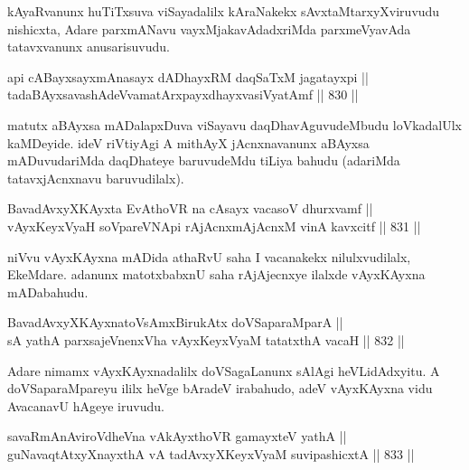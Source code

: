 \begin{artha}
kAyaRvanunx huTiTxsuva viSayadalilx kAraNakekx sAvxtaMtarxyXviruvudu nishicxta, Adare parxmANavu vayxMjakavAdadxriMda parxmeVyavAda tatavxvanunx anusarisuvudu.
\end{artha}

\begin{shl}
api cABayxsayxmAnasayx dADhayxRM daqSaTxM jagatayxpi || \\
tadaBAyxsavashAdeVvamatArxpayxdhayxvasiVyatAmf \hfill || 830 ||  
\end{shl}

\begin{artha}
matutx aBAyxsa mADalapxDuva viSayavu daqDhavAguvudeMbudu loVkadalUlx kaMDeyide. ideV riVtiyAgi A mithAyX jAcnxnavanunx aBAyxsa mADuvudariMda daqDhateye baruvudeMdu tiLiya bahudu (adariMda tatavxjAcnxnavu baruvudilalx).
\end{artha}

\begin{shl}
BavadAvxyXKAyxta EvAthoVR na cAsayx vacasoV dhurxvamf || \\
vAyxKeyxVyaH soV\s pareVNApi rAjAcnxmAjAcnxM vinA kavxcitf \hfill || 831 ||  
\end{shl}
				
\begin{artha}
niVvu vAyxKAyxna mADida athaRvU saha I vacanakekx nilulxvudilalx, EkeMdare. adanunx matotxbabxnU  saha rAjAjecnxye ilalxde vAyxKAyxna mADabahudu.
\end{artha}

\begin{shl}
BavadAvxyXKAyxnatoV\s sAmxBirukAtx doVSaparaMparA || \\
sA yathA parxsajeVnenxVha vAyxKeyxVyaM tatatxthA vacaH \hfill || 832 ||  
\end{shl}

\begin{artha}
Adare nimamx vAyxKAyxnadalilx doVSagaLanunx sAlAgi heVLidAdxyitu. A doVSaparaMpareyu ililx heVge bAradeV irabahudo, adeV vAyxKAyxna vidu  AvacanavU hAgeye iruvudu.
\end{artha}


\begin{shl}
savaRmAnAviroVdheVna vAkAyxthoVR gamayxteV yathA || \\
guNavaqtAtxyX\s nayxthA vA tadAvxyXKeyxVyaM suvipashicxtA \hfill || 833 ||  
\end{shl}

